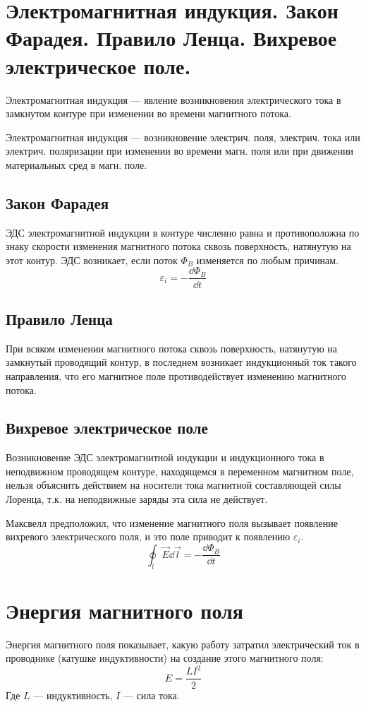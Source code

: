 \documentclass[12pt]{report}
\begin{document}
\setcounter{section}{22}

\section{Электромагнитная индукция. Закон Фарадея. Правило Ленца. Вихревое электрическое поле.}
Электромагнитная индукция --- явление возникновения электрического тока в замкнутом контуре при изменении во времени магнитного потока.

Электромагнитная индукция --- возникновение электрич. поля, электрич. тока или электрич. поляризации при изменении во времени магн. поля или при движении материальных сред в магн. поле.

\subsection{Закон Фарадея}
ЭДС электромагнитной индукции в контуре численно равна и противоположна по знаку скорости изменения магнитного потока сквозь поверхность, натянутую на этот контур. ЭДС возникает, если поток $\Phi_B$ изменяется по любым причинам.
\[
    \varepsilon_i = - \dfrac{\dd{\Phi_B}}{\dd t}
\]

\subsection{Правило Ленца}
При всяком изменении магнитного потока сквозь поверхность, натянутую на замкнутый проводящий контур, в последнем возникает индукционный ток такого направления, что его магнитное поле противодействует изменению магнитного потока.

\subsection{Вихревое электрическое поле}
Возникновение ЭДС электромагнитной индукции и индукционного тока в неподвижном проводящем контуре, находящемся в переменном магнитном поле, нельзя объяснить действием на носители тока магнитной составляющей силы Лоренца, т.к. на неподвижные заряды эта сила не действует.

Максвелл предположил, что изменение магнитного поля вызывает появление вихревого электрического поля, и это поле приводит к появлению $\varepsilon_i$.
\[
    \oint_l \vec{E} \dd{\vec{l}} = -\dfrac{\dd{\Phi_B}}{\dd{t}}
\]

\section{Энергия магнитного поля}
Энергия магнитного поля показывает, какую работу затратил электрический ток в проводнике (катушке индуктивности) на создание этого магнитного поля:
\[
    E = \dfrac{L I^2}{2}
\]
Где $L$ --- индуктивность, $I$ --- сила тока.
\end{document}
